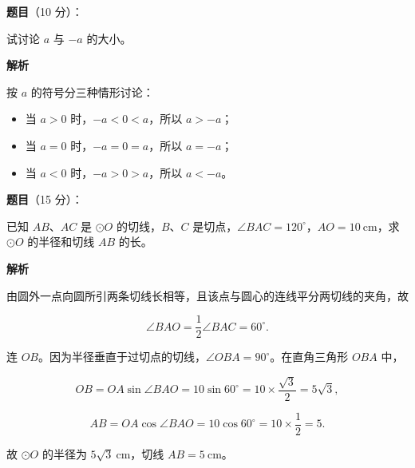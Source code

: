 \begin{answer}

\textbf{题目}（10 分）：

试讨论 $a$ 与 $-a$ 的大小。

\textbf{解析}

按 $a$ 的符号分三种情形讨论：

\begin{itemize}
\item 当 $a>0$ 时，$-a<0<a$，所以 $a>-a$；
\item 当 $a=0$ 时，$-a=0=a$，所以 $a=-a$；
\item 当 $a<0$ 时，$-a>0>a$，所以 $a<-a$。
\end{itemize}


\end{answer}
\begin{answer}

\textbf{题目}（15 分）：

已知 $AB\text{、}AC$ 是 $\odot O$ 的切线，$B\text{、}C$ 是切点，$\angle BAC=120^\circ$，$AO=10\ \mathrm{cm}$，求 $\odot O$ 的半径和切线 $AB$ 的长。
\nopagebreak[4]
\begin{center}\end{center}
\nopagebreak[4]
\textbf{解析}

由圆外一点向圆所引两条切线长相等，且该点与圆心的连线平分两切线的夹角，故

\nopagebreak[4]
\[
\angle BAO=\frac12\angle BAC=60^\circ.
\]

连 $OB$。因为半径垂直于过切点的切线，$\angle OBA=90^\circ$。在直角三角形 $OBA$ 中，

\nopagebreak[4]
\[
OB=OA\sin\angle BAO=10\sin60^\circ=10\times\frac{\sqrt3}{2}=5\sqrt3,
\]

\nopagebreak[4]
\[
AB=OA\cos\angle BAO=10\cos60^\circ=10\times\frac12=5.
\]

故 $\odot O$ 的半径为 $5\sqrt3\ \mathrm{cm}$，切线 $AB=5\ \mathrm{cm}$。


\end{answer}

